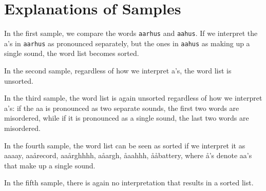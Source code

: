\section*{Explanations of Samples}
In the first sample, we compare the words \texttt{aarhus} and \texttt{aahus}.
If we interpret the a's in \texttt{aarhus} as pronounced separately, but the ones in \texttt{aahus} as making up a single sound, the word list becomes sorted.

In the second sample, regardless of how we interpret a's, the word list is unsorted.

In the third sample, the word list is again unsorted regardless of how we interpret a's:
if the aa is pronounced as two separate sounds, the first two words are misordered, while if it is pronounced as a single sound, the last two words are misordered.

In the fourth sample, the word list can be seen as sorted if we interpret it as aaaay, aaårecord, aaårghhhh, aåargh, åaahhh, ååbattery, where å's denote aa's that make up a single sound.

In the fifth sample, there is again no interpretation that results in a sorted list.
